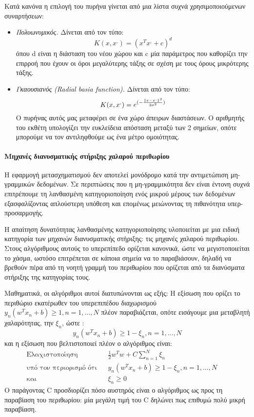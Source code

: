 		Κατά κανόνα η επιλογή του πυρήνα γίνεται από μια λίστα συχνά χρησιμοποιούμενων συναρτήσεων:
		\begin{itemize}
			\item \textit{Πολυωνυμικός.} Δίνεται από τον τύπο:
			\begin{equation}
			K(x, x^,)= (x^T x^, + c)^d
			\end{equation}
			όπου d είναι η διάσταση του νέου χώρου και c μία παράμετρος που καθορίζει την επιρροή που έχουν οι όροι μεγαλύτερης τάξης σε σχέση με τους όρους μικρότερης τάξης.
			\item \textit{Γκαουσιανός (Radial basia function).} Δίνεται από τον τύπο:
		\begin{equation}
		K(x, x^,)= e^{(-\frac{\left\lVert x-x^,\right\rVert^2}{2 \sigma ^2})}
		\end{equation}
			Ο πυρήνας αυτός μας μεταφέρει σε ένα χώρο άπειρων διαστάσεων. Ο αριθμητής του εκθέτη υπολογίζει την ευκλείδεια απόσταση μεταξύ των 2 σημείων, οπότε μπορούμε να τον αντιληφθούμε ως ένα μέτρο ομοιότητας.
		\end{itemize}
		\paragraph{Μηχανές διανυσματικής στήριξης χαλαρού περιθωρίου} Η εφαρμογή μετασχηματισμού δεν αποτελεί μονόδρομο κατά την αντιμετώπιση μη-γραμμικών δεδομένων. Σε περιπτώσεις που η μη-γραμμικότητα δεν είναι έντονη συχνά επιτρέπουμε τη λανθασμένη κατηγοριοποίηση ενός μικρού μέρους των δεδομένων εξασφαλίζοντας απλούστερη υπόθεση και επομένως μειώνοντας τη πιθανότητα υπερ-προσαρμογής.
		
		Η απαίτηση δυνατότητας λανθασμένης κατηγοριοποίησης υλοποιείται με μια ειδική κατηγορία των μηχανών διανυσματικής στήριξης: τις μηχανές χαλαρού περιθωρίου. Στους αλγόριθμους αυτούς το υπερεπίπεδο ορίζεται κανονικά, ώστε να μεγιστοποιείται το χάσμα, ωστόσο επιτρέπεται σε κάποια σημεία να το παραβιάσουν, δηλαδή να βρεθούν πέρα από τη νοητή γραμμή του περιθωρίου που ορίζεται από τα διανύσματα στήριξης της κατηγορίας τους.
		
		
		Μαθηματικά, οι αλγόριθμοι αυτοί διατυπώνονται ως εξής: Η εξίσωση που ορίζει το περιθώριο εκατέρωθεν του υπερεπιπέδου διαχωρισμού $y_n (w^T x_n + b) \geq 1, n=1,..., N$ πλέον παραβιάζεται, οπότε εισάγουμε μια μεταβλητή χαλαρότητας, την $\xi_n$, ώστε :
		\begin{equation}
		y_n (w^T x_n + b) \geq 1 - \xi_n, n=1, ..., N
		\end{equation}
		και η εξίσωση που βελτιστοποιεί πλέον ο αλγόριθμος είναι:
		\begin{align}
		\text{Ελαχιστοποίηση} && \frac{1}{2} w^T w + C \sum_{n=1}^{N} \xi_n  &&\\
		\text{υπό τον περιορισμό ότι} &&y_n (w^T x_n + b) \geq 1 - \xi_n, n=1, ..., N  &&\\
		\text{και} && \xi_n \geq 0  &&
		\end{align}
		Ο παράγοντας C προσδιορίζει πόσο αυστηρός είναι ο αλγόριθμος ως προς τη παραβίαση του περιθωρίου: μία μεγάλη τιμή του C δηλώνει πως επιθυμώ πολύ μικρή παραβίαση.